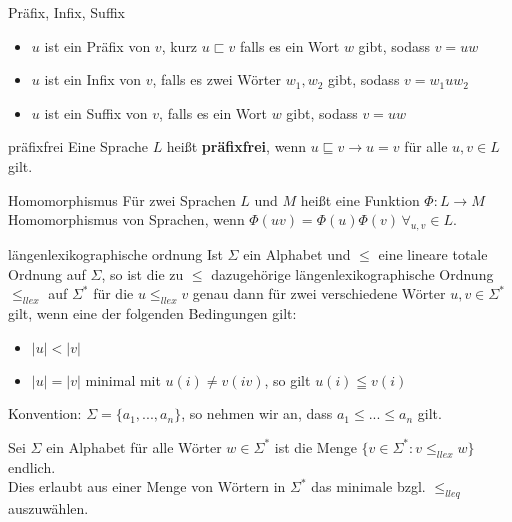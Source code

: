 
\begin{defn}{Präfix, Infix, Suffix}
    \begin{itemize}
        \item $u$ ist ein Präfix von $v$, kurz $u \sqsubset v$ falls es ein Wort $w$ gibt, sodass $v=uw$
        \item $u$ ist ein Infix von $v$,  falls es zwei Wörter $w_1,w_2$ gibt, sodass $v=w_1uw_2$
        \item $u$ ist ein Suffix von $v$, falls es ein Wort $w$ gibt, sodass $v=uw$
    \end{itemize}
\end{defn}

\begin{defn}{präfixfrei}
    Eine Sprache $L$ heißt \textbf{präfixfrei}, wenn $u \sqsubseteq v \rightarrow u = v$ für alle $u,v \in L$ gilt.
\end{defn}

\begin{defn}{Homomorphismus}
    Für zwei Sprachen $L$ und $M$ heißt eine Funktion $\Phi :L\rightarrow M$ Homomorphismus von Sprachen, wenn $\Phi(uv) = \Phi(u)\Phi(v) \, \forall_{u,v} \in L$.
\end{defn}

\begin{defn}{längenlexikographische ordnung}
    Ist $\Sigma$ ein Alphabet und $\leq$ eine lineare totale Ordnung auf $\Sigma$, so ist die zu $\leq$ dazugehörige längenlexikographische Ordnung $\leq_{llex}$ auf $\Sigma^*$ für die $u \leq_{llex} v$ genau dann für zwei verschiedene Wörter $u,v \in \Sigma^*$ gilt, wenn eine der folgenden Bedingungen gilt:
    \begin{itemize}
        \item $|u| < |v|$ 
        \item $|u| = |v|$ minimal mit $u(i) \neq v(iv)$, so gilt $u(i) \leqq v(i)$
    \end{itemize}
    Konvention: $\Sigma = \{a_1,...,a_n\}$, so nehmen wir an, dass $a_1\leq...\leq a_n$ gilt.
\end{defn}

\begin{bem}
    Sei $\Sigma$ ein Alphabet für alle Wörter $w \in \Sigma^*$ ist die Menge $\{v \in \Sigma^*:v\leq_{llex}w\}$ endlich. \\
    Dies erlaubt aus einer Menge von Wörtern in $\Sigma^*$ das minimale bzgl. $\leq_{lleq}$ auszuwählen.
\end{bem}

